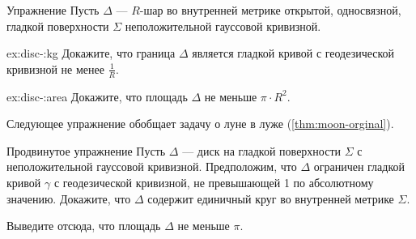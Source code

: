 \begin{thm}{Упражнение}\label{ex:disc-}
Пусть $\Delta$ --- $R$-шар во внутренней метрике открытой, односвязной, гладкой поверхности $\Sigma$ неположительной гауссовой кривизной.

\begin{subthm}{ex:disc-:kg}
Докажите, что граница $\Delta$ является гладкой кривой с геодезической кривизной не менее $\tfrac1R$.
\end{subthm}

\begin{subthm}{ex:disc-:area}
Докажите, что площадь $\Delta$ не меньше $\pi\cdot R^2$.
\end{subthm}

\end{thm}

Следующее упражнение обобщает задачу о луне в луже (\ref{thm:moon-orginal}).

\begin{thm}{Продвинутое упражнение}\label{ex:moon-}
Пусть $\Delta$ --- диск на гладкой поверхности $\Sigma$ с неположительной гауссовой кривизной.
Предположим, что $\Delta$ ограничен гладкой кривой $\gamma$ с геодезической кривизной, не превышающей 1 по абсолютному значению.
Докажите, что $\Delta$ содержит единичный круг во внутренней метрике $\Sigma$.

Выведите отсюда, что площадь $\Delta$ не меньше $\pi$.
\end{thm}
